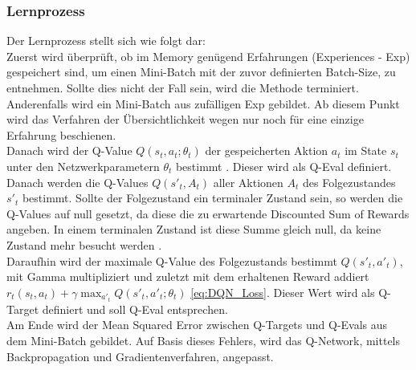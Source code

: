 \subsubsection{Lernprozess} \label{subsubsec:Konzept_Lernprozess_DQN}
Der Lernprozess stellt sich wie folgt dar:\\
Zuerst wird überprüft, ob im Memory genügend Erfahrungen (Experiences - Exp) gespeichert sind, um einen Mini-Batch mit der zuvor definierten Batch-Size, zu entnehmen. Sollte dies nicht der Fall sein, wird die Methode terminiert. Anderenfalls wird ein Mini-Batch aus zufälligen Exp gebildet. Ab diesem Punkt wird das Verfahren der Übersichtlichkeit wegen nur noch für eine einzige Erfahrung beschienen.\\
Danach wird der Q-Value $Q(s_t,a_t;\theta_t)$ der gespeicherten Aktion $a_t$ im State $s_t$ unter den Netzwerkparametern $\theta_t$ bestimmt . Dieser wird als Q-Eval definiert.\\
Danach werden die Q-Values $Q(s'_t,A_t)$ aller Aktionen $A_t$ des Folgezustandes $s'_t$  bestimmt. Sollte der Folgezustand ein terminaler Zustand sein, so werden die Q-Values auf null gesetzt, da diese die zu erwartende Discounted Sum of Rewards angeben. In einem terminalen Zustand ist diese Summe gleich null, da keine Zustand mehr besucht werden .\\
Daraufhin wird der maximale Q-Value des Folgezustands bestimmt $Q(s'_t,a'_t)$, mit Gamma multipliziert und zuletzt mit dem erhaltenen Reward addiert $r_t(s_t,a_t) + \gamma \max_{a'_t}Q(s'_t,a'_t;\theta_t)$ \autoref{eq:DQN_Loss}. Dieser Wert wird als Q-Target definiert und soll Q-Eval entsprechen.\\
Am Ende wird der Mean Squared Error zwischen Q-Targets und Q-Evals aus dem Mini-Batch gebildet. Auf Basis dieses Fehlers, wird das Q-Network, mittels Backpropagation und Gradientenverfahren, angepasst.

